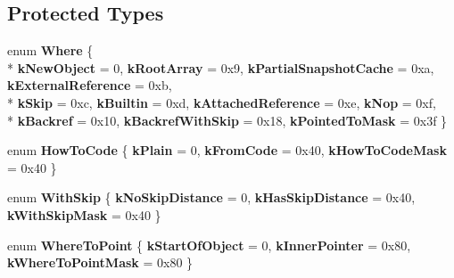 \subsection*{Protected Types}
\begin{DoxyCompactItemize}
\item 
\hypertarget{classv8_1_1internal_1_1_serializer_deserializer_a338d50f92903ec056650135e60139c8a}{}enum {\bfseries Where} \{ \\*
{\bfseries k\+New\+Object} = 0, 
{\bfseries k\+Root\+Array} = 0x9, 
{\bfseries k\+Partial\+Snapshot\+Cache} = 0xa, 
{\bfseries k\+External\+Reference} = 0xb, 
\\*
{\bfseries k\+Skip} = 0xc, 
{\bfseries k\+Builtin} = 0xd, 
{\bfseries k\+Attached\+Reference} = 0xe, 
{\bfseries k\+Nop} = 0xf, 
\\*
{\bfseries k\+Backref} = 0x10, 
{\bfseries k\+Backref\+With\+Skip} = 0x18, 
{\bfseries k\+Pointed\+To\+Mask} = 0x3f
 \}\label{classv8_1_1internal_1_1_serializer_deserializer_a338d50f92903ec056650135e60139c8a}

\item 
\hypertarget{classv8_1_1internal_1_1_serializer_deserializer_a3806541ecf89447911d72c6ccd7bb43e}{}enum {\bfseries How\+To\+Code} \{ {\bfseries k\+Plain} = 0, 
{\bfseries k\+From\+Code} = 0x40, 
{\bfseries k\+How\+To\+Code\+Mask} = 0x40
 \}\label{classv8_1_1internal_1_1_serializer_deserializer_a3806541ecf89447911d72c6ccd7bb43e}

\item 
\hypertarget{classv8_1_1internal_1_1_serializer_deserializer_a47fa997ccf627dbad8ecbe519c5c1863}{}enum {\bfseries With\+Skip} \{ {\bfseries k\+No\+Skip\+Distance} = 0, 
{\bfseries k\+Has\+Skip\+Distance} = 0x40, 
{\bfseries k\+With\+Skip\+Mask} = 0x40
 \}\label{classv8_1_1internal_1_1_serializer_deserializer_a47fa997ccf627dbad8ecbe519c5c1863}

\item 
\hypertarget{classv8_1_1internal_1_1_serializer_deserializer_ab62aa66a8d8e959c1d118dbec6d921b6}{}enum {\bfseries Where\+To\+Point} \{ {\bfseries k\+Start\+Of\+Object} = 0, 
{\bfseries k\+Inner\+Pointer} = 0x80, 
{\bfseries k\+Where\+To\+Point\+Mask} = 0x80
 \}\label{classv8_1_1internal_1_1_serializer_deserializer_ab62aa66a8d8e959c1d118dbec6d921b6}

\end{DoxyCompactItemize}
